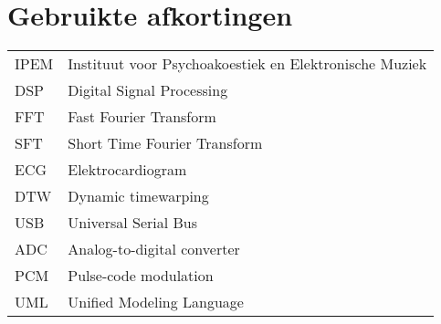 \chapter{Gebruikte afkortingen}
\begin{flushleft}
	\renewcommand{\baselinestretch}{1.5}
	\small\normalsize
	\begin{longtable}{ll}
		IPEM				&  Instituut voor Psychoakoestiek en Elektronische Muziek \\
		DSP					&  Digital Signal Processing \\
		FFT					&  Fast Fourier Transform \\
		SFT					&  Short Time Fourier Transform \\
		ECG					&  Elektrocardiogram \\
		DTW					&  Dynamic timewarping \\
		USB					&  Universal Serial Bus \\
		ADC					&  Analog-to-digital converter \\
		PCM					&  Pulse-code modulation \\
		UML					&  Unified Modeling Language
		
	\end{longtable}
\end{flushleft}